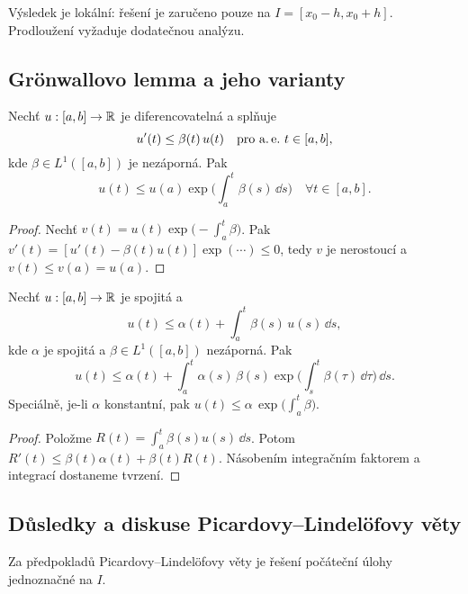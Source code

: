 \begin{remark}
\label{rem:lokalni}
Výsledek je lokální: řešení je zaručeno pouze na $I=[x_0-h,x_0+h]$. Prodloužení vyžaduje dodatečnou analýzu.
\end{remark}

\spc

\subsection{Gr\"onwallovo lemma a jeho varianty}
\label{sec:gronwall}

\begin{lemma}
\label{lem:gronwall-diff}
Nechť $u:[a,b]\to\mathbb{R}$ je diferencovatelná a splňuje
\[
u'(t)\le \beta(t)\,u(t) \quad \text{pro a.\,e.\ } t\in[a,b],
\]
kde $\beta\in L^1([a,b])$ je nezáporná. Pak
\[
u(t)\le u(a)\exp\!\Big(\int_a^{t}\beta(s)\,\dd s\Big) \quad \forall t\in[a,b].
\]
\end{lemma}

\begin{proof}
Nechť $v(t)=u(t)\exp\!\big(-\int_a^{t}\beta\big)$. Pak $v'(t)=[u'(t)-\beta(t)u(t)]\exp(\cdots)\le 0$, tedy $v$ je nerostoucí a $v(t)\le v(a)=u(a)$.
\end{proof}

\begin{lemma}
\label{lem:gronwall-int}
Nechť $u:[a,b]\to\mathbb{R}$ je spojitá a
\[
u(t)\le \alpha(t)+\int_a^{t}\beta(s)\,u(s)\,\dd s,
\]
kde $\alpha$ je spojitá a $\beta\in L^1([a,b])$ nezáporná. Pak
\[
u(t)\le \alpha(t)+\int_a^{t}\alpha(s)\,\beta(s)\exp\!\Big(\int_s^{t}\beta(\tau)\,\dd\tau\Big)\,\dd s.
\]
Speciálně, je-li $\alpha$ konstantní, pak $u(t)\le \alpha\,\exp\!\big(\int_a^{t}\beta\big)$.
\end{lemma}

\begin{proof}
Položme $R(t)=\int_a^{t}\beta(s)u(s)\,\dd s$. Potom $R'(t)\le \beta(t)\alpha(t)+\beta(t)R(t)$. 
Násobením integračním faktorem a integrací dostaneme tvrzení.
\end{proof}

\spc

\subsection{Důsledky a diskuse Picardovy–Lindel\"ofovy věty}
\label{sec:dusledky-picard}

\begin{theorem}[Jednoznačnost]
\label{vet:jednoznacnost}
Za předpokladů Picardovy–Lindel\"ofovy věty je řešení počáteční úlohy jednoznačné na $I$.
\end{theorem}

